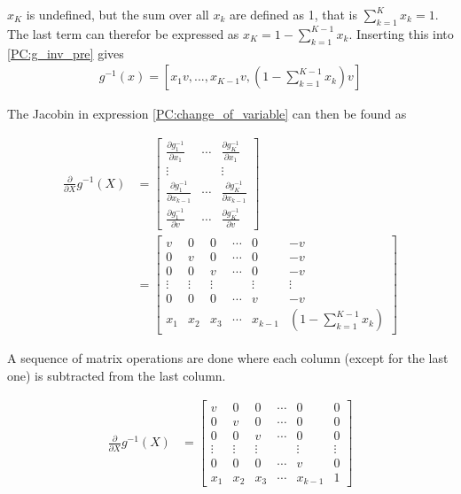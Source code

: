 \documentclass{article}
\begin{document}
$x_{K}$ is undefined, but the sum over all $x_k$ are defined as 1, that is $\sum_{k=1}^K x_k=1$. The last term can therefor be expressed as $x_K = 1 - \sum_{k=1}^{K-1} x_k$. Inserting this into \ref{PC:g_inv_pre} gives
\begin{align}
    g^{-1}(x) = \left[ x_1 v, ... , x_{K-1} v, \left(1 - \sum_{k=1}^{K-1} x_k \right) v \right] \label{g_inv}
\end{align}

The Jacobin in expression \ref{PC:change_of_variable} can then be found as

\begin{align}
    \frac{\partial}{\partial X} g^{-1}(X) &= \begin{bmatrix} \frac{\partial g_1^{-1}}{\partial x_1} & \cdots & \frac{\partial g_K^{-1}}{\partial x_1}\\
    \vdots & & \vdots\\
    \frac{\partial g_1^{-1}}{\partial x_{k-1}} & \cdots & \frac{\partial g_K^{-1}}{\partial x_{k-1}} \\
    \frac{\partial g_1^{-1}}{\partial v} & \cdots & \frac{\partial g_K^{-1}}{\partial v}\end{bmatrix}\\
    &= \begin{bmatrix}
    v & 0 & 0 & \cdots & 0 & -v\\
    0 & v & 0 & \cdots & 0 & -v\\
    0 & 0 & v & \cdots & 0 & -v\\
    \vdots & \vdots & \vdots & & \vdots & \vdots\\
    0 & 0 & 0 & \cdots & v & -v\\
    x_1 & x_2 & x_3 & \cdots & x_{k-1} &\left(1 - \sum_{k=1}^{K-1} x_k \right)
    \end{bmatrix}
\end{align}

A sequence of matrix operations are done where each column (except for the last one) is subtracted from the last column.

\begin{align}
    \frac{\partial}{\partial X} g^{-1}(X) &= \begin{bmatrix}
    v & 0 & 0 & \cdots & 0 & 0\\
    0 & v & 0 & \cdots & 0 & 0\\
    0 & 0 & v & \cdots & 0 & 0\\
    \vdots & \vdots & \vdots & & \vdots & \vdots\\
    0 & 0 & 0 & \cdots & v & 0\\
    x_1 & x_2 & x_3 & \cdots & x_{k-1} & 1
    \end{bmatrix}
\end{align}
\end{document}
